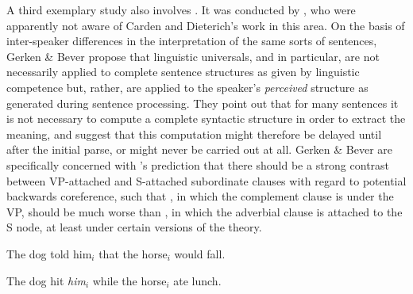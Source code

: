A third exemplary study also involves . It was conducted by \citet{GerkenEtAl1986}, who were apparently not aware of Carden
and Dieterich's work in this area. On the basis of inter-speaker differences in the interpretation of the same sorts of sentences, Gerken \& Bever propose that linguistic universals, and  in particular, are not necessarily applied to complete sentence structures as given by linguistic competence but, rather, are applied to the speaker's \textit{perceived} structure as generated during sentence processing. They point out that for many sentences it is not necessary to compute a complete syntactic structure in order to extract the meaning, and suggest that this computation might therefore be delayed until after the initial parse, or might never be carried out at all. Gerken \& Bever are specifically concerned with 's prediction that there should be a strong contrast between VP-attached and S-attached subordinate clauses with regard to potential backwards coreference, such that , in which the complement clause is under the VP, should be much worse than , in which the adverbial clause is attached to the S node, at least under certain versions of the theory.


\ea\label{ex:1:4}
The dog told him$_i$ that the horse$_i$ would fall.
\z


\ea\label{ex:1:5}
The dog hit \textit{him$_i$} while the horse$_i$ ate lunch.
\z

